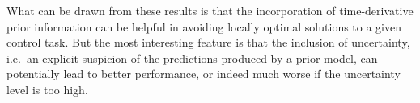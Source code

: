 What can be drawn from these results is that the incorporation of time-derivative prior information can be helpful in avoiding locally optimal solutions to a given control task. But the most interesting feature is that the inclusion of uncertainty, i.e.\ an explicit suspicion of the predictions produced by a prior model, can potentially lead to better performance, or indeed much worse if the uncertainty level is too high.



\begin{figure}
\centering \footnotesize
{}
\end{figure}
